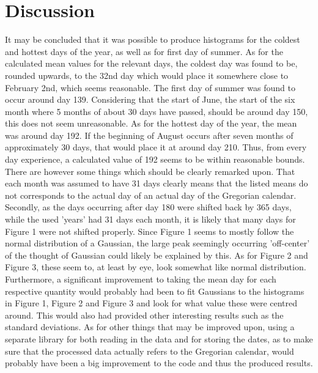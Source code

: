 \documentclass[a4, 12pt]{article}
\begin{document}
\section{Discussion}
It may be concluded that it was possible to produce histograms for the coldest and hottest days of the year, as well as for first day of summer. As for the calculated mean values for the relevant days, the coldest day was found to be, rounded upwards, to the 32nd day which would place it somewhere close to February 2nd, which seems reasonable. The first day of summer was found to occur around day 139. Considering that the start of June, the start of the six month where 5 months of about 30 days have passed, should be around day 150, this does not seem unreasonable. As for the hottest day of the year, the mean was around day 192. If the beginning of August occurs after seven months of approximately 30 days, that would place it at around day 210. Thus, from every day experience, a calculated value of 192 seems to be within reasonable bounds. \newline 
\indent There are however some things which should be clearly remarked upon. That each month was assumed to have 31 days clearly means that the listed means do not corresponds to the actual day of an actual day of the Gregorian calendar. Secondly, as the days occurring after day 180 were shifted back by 365 days, while the used 'years' had 31 days each month, it is likely that many days for Figure 1 were not shifted properly. Since Figure 1 seems to mostly follow the normal distribution of a Gaussian, the large peak seemingly occurring 'off-center' of the thought of Gaussian could likely be explained by this. As for Figure 2 and Figure 3, these seem to, at least by eye, look somewhat like normal distribution. Furthermore, a significant improvement to taking the mean day for each respective quantity would probably had been to fit Gaussians to the histograms in Figure 1, Figure 2 and Figure 3 and look for what value these were centred around. This would also had provided other interesting results such as the standard deviations. \newline
\indent As for other things that may be improved upon, using a separate library for both reading in the data and for storing the dates, as to make sure that the processed data actually refers to the Gregorian calendar, would probably have been a big improvement to the code and thus the produced results. \newline
\end{document}
